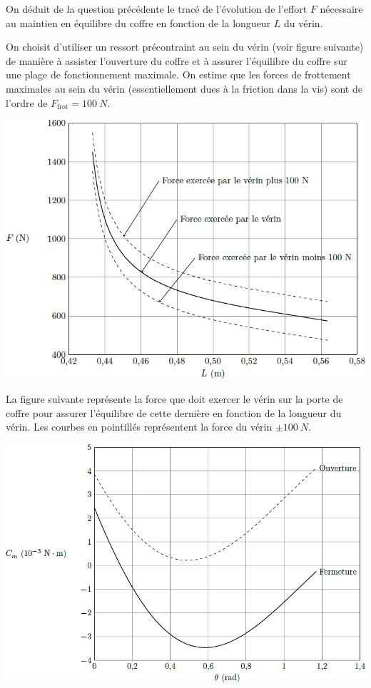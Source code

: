\documentclass[10pt,fleqn]{article} %
\begin{document}
\begin{multicols}{2}
\begin{multicols}{2}
On déduit de la question précédente le tracé de l’évolution de l’effort $F$ nécessaire au maintien en équilibre du coffre en fonction de la longueur $L$ du vérin.

On choisit d’utiliser un ressort précontraint au sein du vérin (voir figure suivante) de manière à assister l’ouverture du coffre et à assurer l’équilibre du coffre sur une plage de fonctionnement maximale. On estime que les forces de frottement maximales au sein du vérin (essentiellement dues à la friction dans la vis) sont de l’ordre de $F_{\text{frot}}=\SI{100}{N}$. 


\begin{center}
\includegraphics[width=\linewidth]{images/fig_03}
\end{center}

La figure suivante représente la force que doit exercer le vérin sur la porte de coffre pour assurer
l’équilibre de cette dernière en fonction de la longueur du vérin. Les courbes en pointillés représentent la force du vérin $\pm\SI{100}{N}$.


\begin{center}
\includegraphics[width=\linewidth]{images/fig_04}
\end{center}



\end{multicols}
\end{multicols}
\end{document}
